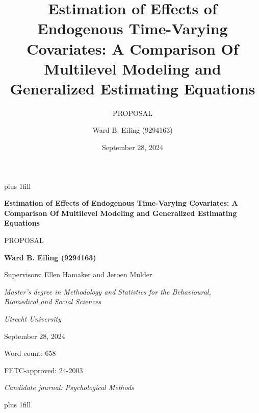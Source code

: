 \documentclass[
  12pt,
  a4paper,
]{article}
\title{Estimation of Effects of Endogenous Time-Varying Covariates: A
Comparison Of Multilevel Modeling and Generalized Estimating Equations}
\subtitle{PROPOSAL}
\author{Ward B. Eiling (9294163)}
\date{September 28, 2024}
\begin{document}
\cleardoublepage
\thispagestyle{empty}
{\centering
\hbox{}\vskip 0cm plus 1fill
{\Large\bfseries Estimation of Effects of Endogenous Time-Varying
Covariates: A Comparison Of Multilevel Modeling and Generalized
Estimating Equations \par}
\vspace{3ex}
{\large PROPOSAL \par}
\vspace{9ex}
{\large\bfseries Ward B. Eiling (9294163) \par}
\vspace{3ex}
{\large Supervisors: Ellen Hamaker and Jeroen Mulder \par}
\vspace{9ex}
{\normalsize \textit{Master's degree in Methodology and Statistics for the Behavioural, \\ Biomedical and Social Sciences} \par}
\vspace{3ex}
{\normalsize \textit{Utrecht University} \par}
\vspace{9ex}
{\normalsize September 28, 2024 \par}
\vspace{3ex}
{\normalsize Word count: 658 \par}
\vspace{9ex}
{\normalsize FETC-approved: 24-2003 \par}
\vspace{9ex}
{\normalsize \textit{Candidate journal: Psychological Methods} \par}
\hbox{}\vskip 0cm plus 1fill
}
\ifdefined\Shaded\renewenvironment{Shaded}{\begin{tcolorbox}[sharp corners, breakable, boxrule=0pt, interior hidden, borderline west={3pt}{0pt}{shadecolor}, enhanced, frame hidden]}{\end{tcolorbox}}\fi
\end{document}
